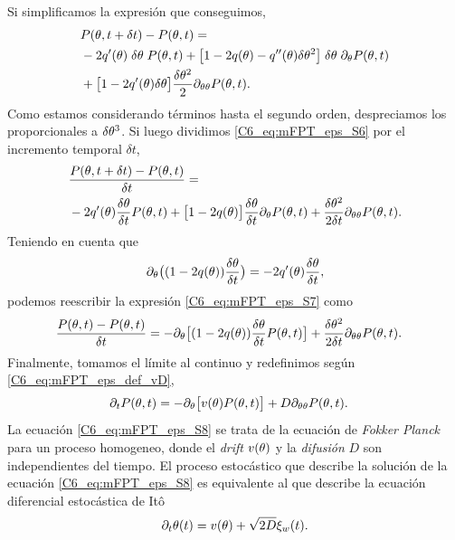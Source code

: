 \documentclass[./main.tex]{subfiles}
\begin{document}
Si simplificamos la expresión que conseguimos, 
\begin{align}
     & P( \theta,t + \delta t) - P(\theta,t) = \nonumber \\
     & - 2 q'(\theta) \; \delta\theta \; P(\theta,t) + \big[ 1- 2 q(\theta) - q''(\theta) \delta\theta^2 \big] \; \delta\theta \; \partial_\theta P(\theta,t) \nonumber \\ & +\big[ 1-2 q'(\theta) \delta\theta \big] \frac{\delta\theta^2}{2}\partial_{\theta \theta} P(\theta,t)  .
     \label{C6_eq:mFPT_eps_S6}
\end{align}
Como estamos considerando términos hasta el segundo orden, despreciamos los proporcionales a $\delta\theta^3$. Si luego dividimos \ref{C6_eq:mFPT_eps_S6} por el incremento temporal $\delta t$,
\begin{align}
    & \frac{P( \theta,t + \delta t) - P(\theta,t)}{\delta t}  = \nonumber \\ & - 2 q'(\theta) \frac{\delta\theta}{\delta t} P(\theta,t) + \big[ 1- 2 q(\theta) \big] \frac{\delta\theta}{\delta t} \partial_\theta P(\theta,t) +  \frac{\delta\theta^2}{2 \delta t}\partial_{\theta \theta} P(\theta,t).
    \label{C6_eq:mFPT_eps_S7}
\end{align}
Teniendo en cuenta que 
\begin{align}
    \partial_\theta\big( (1-2q(\theta)) \frac{\delta\theta}{\delta t} \big) = - 2 q'(\theta) \frac{\delta\theta}{\delta t},
\end{align}
podemos reescribir la expresión \ref{C6_eq:mFPT_eps_S7} como 
\begin{align}
    \frac{P(\theta,t) - P(\theta,t) }{\delta t} &= - \partial_\theta \big[ (1-2q(\theta)) \frac{\delta\theta}{\delta t} P(\theta,t) \big] + \frac{\delta\theta^2}{2 \delta t}\partial_{\theta \theta} P(\theta,t).
\end{align}
Finalmente, tomamos el límite al continuo y redefinimos según \ref{C6_eq:mFPT_eps_def_vD}, 
\begin{align}
   \partial_t P(\theta,t) &= - \partial_\theta \big[ v(\theta) P(\theta,t) \big] + D \partial_{\theta \theta} P(\theta,t).
   \label{C6_eq:mFPT_eps_S8}
\end{align}
La ecuación \ref{C6_eq:mFPT_eps_S8} se trata de la ecuación de \emph{Fokker Planck} para un proceso homogeneo, donde el \emph{drift} $v(\theta)$ y la \emph{difusión} $D$ son independientes del tiempo. El proceso estocástico que describe la solución de la ecuación \ref{C6_eq:mFPT_eps_S8} es equivalente al que describe la ecuación diferencial estocástica de Itô \cite{Gardiner}
\begin{equation}
    \partial_t  \theta(t) =  v(\theta) + \sqrt{2D} \xi_w(t).
\end{equation}
\end{document}
